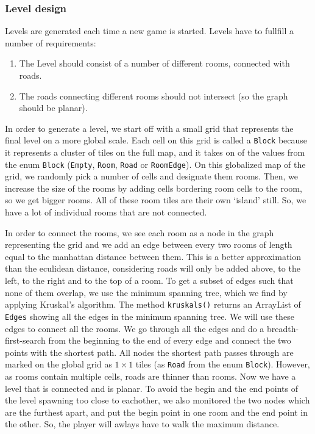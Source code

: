 \documentclass[../main.tex]{subfiles}
\begin{document}
		\subsubsection{Level design}\label{sec: level design}
		Levels are generated each time a new game is started. Levels have to fullfill a number of requirements:
		\begin {enumerate}
			\item {The Level should consist of a number of different rooms, connected with roads}.
			\item {The roads connecting different rooms should not intersect (so the graph should be planar).}
		\end {enumerate}
		In order to generate a level, we start off with a small grid that represents the final level on a more global scale. Each cell on this grid is called a \texttt{Block} because it represents a cluster of tiles on the full map, and it takes on of the values from the enum \texttt{Block} (\texttt{Empty}, \texttt{Room}, \texttt{Road} or \texttt{RoomEdge}). On this globalized map of the grid, we randomly pick a number of cells and designate them rooms. Then, we increase the size of the rooms by adding cells bordering room cells to the room, so we get bigger rooms. All of these room tiles are their own `island' still. So, we have a lot of individual rooms that are not connected. 
		
		In order to connect the rooms, we see each room as a node in the graph representing the grid and we add an edge between every two rooms of length equal to the manhattan distance between them. This is a better approximation than the eculidean distance, considering roads will only be added above, to the left, to the right and to the top of a room. To get a subset of edges such that none of them overlap, we use the minimum spanning tree, which we find by applying Kruskal's algorithm. The method \texttt{kruskals()} returns an ArrayList of \texttt{Edges} showing all the edges in the minimum spanning tree. We will use these edges to connect all the rooms. We go through all the edges and do a breadth-first-search from the beginning to the end of every edge and connect the two points with the shortest path. All nodes the shortest path passes through are marked on the global grid as $1\times1$ tiles (as \texttt{Road} from the enum \texttt{Block}). However, as rooms contain multiple cells, roads are thinner than rooms. Now we have a level that is connected and is planar. To avoid the begin and the end points of the level spawning too close to eachother, we also monitored the two nodes which are the furthest apart, and put the begin point in one room and the end point in the other. So, the player will awlays have to walk the maximum distance. 
		
\end{document}

